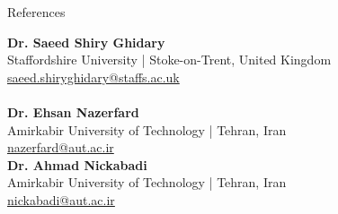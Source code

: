\documentclass{resume} %
\begin{document}
\begin{rSection}{References}

\begin{multicols}{3}
\textbf{Dr. Saeed Shiry Ghidary}\\
Staffordshire University | Stoke-on-Trent, United Kingdom\\
\href{mailto:saeed.shiryghidary@staffs.ac.uk}{saeed.shiryghidary@staffs.ac.uk}
\\
\\
\textbf{Dr. Ehsan Nazerfard}\\
Amirkabir University of Technology | Tehran, Iran\\
\href{mailto:nazerfard@aut.ac.ir}{nazerfard@aut.ac.ir}
\\

\textbf{Dr. Ahmad Nickabadi}\\
Amirkabir University of Technology | Tehran, Iran\\
\href{mailto:nickabadi@aut.ac.ir}{nickabadi@aut.ac.ir}
\\
\end{multicols}

\end{rSection}
\end{document}
